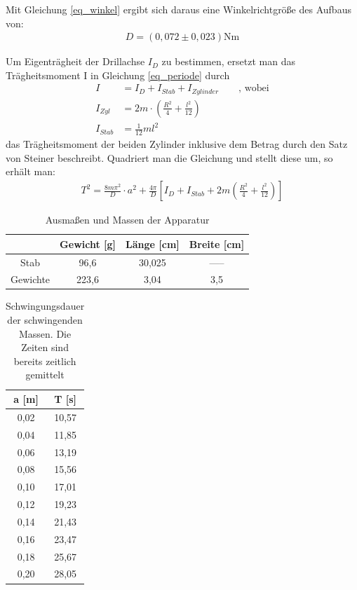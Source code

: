 Mit Gleichung \eqref{eq_winkel} ergibt sich daraus eine Winkelrichtgröße des Aufbaus von:
\begin{align*}
D=(0,072 \pm0,023) \text{Nm}
\end{align*}


Um Eigenträgheit der Drillachse $I_D$ zu bestimmen, ersetzt man das Trägheitsmoment I in Gleichung \eqref{eq_periode} durch
\begin{align*}
I&=I_D+I_{Stab}+I_{Zylinder} \qquad \text{, wobei}\\
I_{Zyl}&=2m\cdot\left(\frac{R^2}{4}+\frac{l^2}{12}\right)\\
I_{Stab}&= \frac{1}{12}ml^2
\end{align*}
das Trägheitsmoment der beiden Zylinder inklusive dem Betrag durch den Satz von Steiner beschreibt.
Quadriert man die Gleichung und stellt diese um, so erhält man:
\begin{align}
T^2=\frac{8m\pi^2}{D}\cdot a^2 + \frac{4\pi}{D}  \left[  I_D+I_{Stab}+2m\left(\frac{R^2}{4}+\frac{l^2}{12}\right)\right]
\end{align}

\begin{table}[htbp]
\begin{tabular}{|c|c|c|c|}
\hline 
 & Gewicht [g] & Länge [cm] & Breite [cm] \\ 
\hline 
Stab & 96,6 & 30,025 & ----- \\ 
\hline 
Gewichte & 223,6 & 3,04 & 3,5 \\ 
\hline 
\end{tabular}\newline
\caption{Ausmaßen und Massen der Apparatur}
\end{table}

\begin{table}[htbp]
\begin{tabular}{|c|c|}
\hline
a [m] &	T [s]\\ \hline
0,02&	10,57\\ \hline
0,04&	11,85\\ \hline
0,06&	13,19\\ \hline
0,08&	15,56\\ \hline
0,10&	17,01\\ \hline
0,12&	19,23\\ \hline
0,14&	21,43\\ \hline
0,16&	23,47\\ \hline
0,18&	25,67\\ \hline
0,20&	28,05\\ \hline
\end{tabular} 
\caption{Schwingungsdauer der schwingenden Massen. Die Zeiten sind bereits zeitlich gemittelt}
\end{table}

